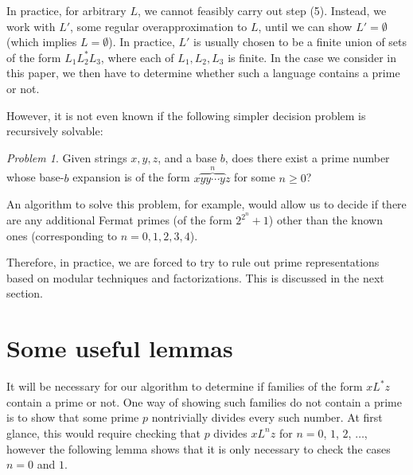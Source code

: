 \documentclass[12pt]{article}
\theoremstyle{plain}
\theoremstyle{definition}
\theoremstyle{remark}
\newtheorem{problem}[theorem]{Problem}
\begin{document}
In practice, for arbitrary $L$,
we cannot feasibly carry out step (5).  Instead, we work
with $L'$, some regular overapproximation to $L$, until we can show $L' =
\emptyset$ (which implies $L = \emptyset$).  In practice,
$L'$ is usually chosen to be a finite union of sets of the form 
$L_1 L_2^* L_3$, where each of $L_1, L_2, L_3$ is finite.
In the case we consider in this paper,
we then have to determine whether such a language contains
a prime or not.

However, it is not even known if the following simpler decision problem is 
recursively solvable:

\medskip

\begin{problem}
Given strings $x, y, z$, and a base $b$, does there exist a prime
number whose base-$b$ expansion is of the form $x \overbrace{yy\cdots y}^n z$
for some $n \geq 0$?
\end{problem}

\medskip

An algorithm to solve this problem, for example, would allow us to decide
if there are any additional Fermat primes (of the form $2^{2^n}+1$)
other than the known ones (corresponding to $n = 0,1,2,3,4$).

Therefore, in practice, we are forced to try to rule out prime
representations based on modular techniques and factorizations.
This is discussed in the next section.

\section{Some useful lemmas}
It will be necessary for our algorithm to determine if families of the
form $xL^*z$ contain a prime or not.  One way of showing such families
do not contain a prime is to show that some prime $p$ nontrivially
divides every such number.  At first glance, this would require
checking that $p$ divides $xL^nz$ for $n=0$, $1$, $2$, $\dotsc$,
however the following lemma shows that it is only necessary to check
the cases $n=0$ and $1$.
\end{document}

